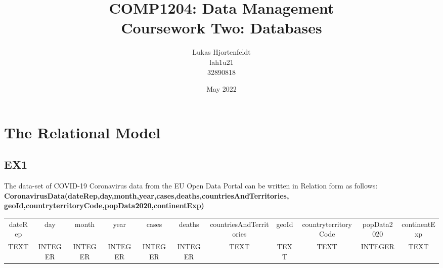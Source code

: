 \documentclass[10pt]{article}
\title{COMP1204: Data Management \\ Coursework Two: Databases}
\author{Lukas Hjortenfeldt\\
lah1u21\\
32890818}
\date{May 2022}
\begin{document}
\maketitle
\thispagestyle{empty}
\clearpage
{}
\newpage

\section{The Relational Model}
\subsection{EX1}
The data-set of COVID-19 Coronavirus data from the EU Open Data Portal can be written in Relation form as follows: \\
\textbf{CoronavirusData(dateRep,day,month,year,cases,deaths,countriesAndTerritories,\\geoId,countryterritoryCode,popData2020,continentExp)}

\begin{center}
    \begin{adjustbox}{width=500pt,center}
    \begin{tabular}{ |c|c|c|c|c|c|c|c|c|c|c| } 
    \hline
    dateRep & day & month & year & cases & deaths & countriesAndTerritories & geoId & countryterritoryCode & popData2020 & continentExp\\ 
    TEXT & INTEGER & INTEGER & INTEGER & INTEGER & INTEGER & TEXT & TEXT & TEXT & INTEGER & TEXT\\
    \hline
    \end{tabular}
    \end{adjustbox}
\end{center}
\end{document}
